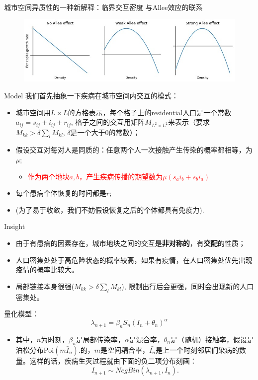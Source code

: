 \begin{frame}{城市空间异质性的一种新解释：临界交互密度}
    与Allee效应的联系
    \begin{figure}
        \centering
        \includegraphics[width = 0.8\linewidth]{pics/allee.jpg}
    \end{figure}
\end{frame}

\begin{frame}{Model}
    我们首先抽象一下疾病在城市空间内交互的模式：
    \begin{itemize}
        \item 城市空间用$L\times L$的方格表示，每个格子上的residential人口是一个常数$a_{ij} = s_{ij}+i_{ij}+r_{ij}$, 格子之间的交互用矩阵$M_{L^2\times L^2}$来表示（要求$M_{kk} > \delta \sum_l M_{kl}$, $\delta$是一个大于$0$的常数）；
        \item 假设交互对每对人是同质的：任意两个人一次接触产生传染的概率都相等，为$\mu$; 
        \begin{itemize}
            \item \textcolor{red}{作为两个地块$a,b$，产生疾病传播的期望数为$\mu (s_a i_b + s_b i_a)$}
        \end{itemize}
        \item 每个患病个体恢复的时间都是$r$; 
        \item (为了易于收敛，我们不妨假设恢复之后的个体都具有免疫力).
    \end{itemize}
\end{frame}

\begin{frame}{Insight}
    \begin{itemize}
        \item 由于有患病的因素存在，城市地块之间的交互是\textbf{非对称的}，有\textbf{交配}的性质；
        \item 人口密集处处于高危险状态的概率较高，如果有疫情，在人口密集处优先出现疫情的概率比较大。
        \item 局部链接本身很强($M_{kk} > \delta \sum_l M_{kl}$), 限制出行后会更强，同时会出现新的人口密集处。
    \end{itemize}
    量化模型：\[\lambda_{n+1} = \beta_n S_n (I_n + \theta_n)^\alpha\]
    \begin{itemize}
        \item 其中，$n$为时刻，$\beta_n$是局部传染率，$\alpha$是混合率，$\theta_n$是（随机）接触率，假设是泊松分布$\text{Poi}(m\bar{I}_n).$的，$m$是空间耦合率，$\bar{I_n}$是上一个时刻邻居们染病的数量。这样的话，疾病生灭过程就由下面的负二项分布刻画：\[I_{n+1} \sim NegBin(\lambda_{n+1},I_n).\]
    \end{itemize}
\end{frame}

